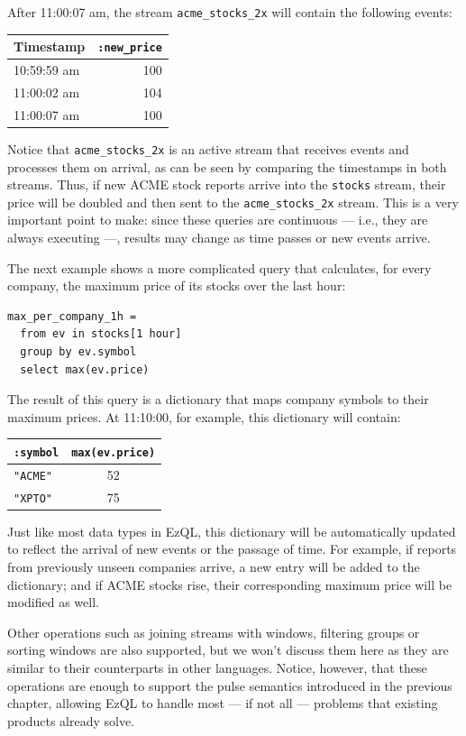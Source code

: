 \documentclass{report}
\begin{document}
After 11:00:07 am, the stream \verb=acme_stocks_2x= will contain the
following events:

\begin{tabular}{ |l|r| }
  \hline
  Timestamp & \verb=:new_price= \\
  \hline
  10:59:59 am & 100 \\
  11:00:02 am & 104 \\
  11:00:07 am & 100 \\
  \hline
\end{tabular}

Notice that \verb=acme_stocks_2x= is an active stream that receives
events and processes them on arrival, as can be seen by comparing the
timestamps in both streams. Thus, if new ACME stock reports arrive
into the \verb=stocks= stream, their price will be doubled and then
sent to the \verb=acme_stocks_2x= stream. This is a very important
point to make: since these queries are continuous --- i.e., they are
always executing ---, results may change as time passes or new events
arrive.

The next example shows a more complicated query that calculates, for
every company, the maximum price of its stocks over the last hour:

\begin{verbatim}
max_per_company_1h =
  from ev in stocks[1 hour]
  group by ev.symbol
  select max(ev.price)
\end{verbatim}

The result of this query is a dictionary that maps company symbols to
their maximum prices. At 11:10:00, for example, this dictionary will
contain:

\begin{tabular}{ |l|c| }
  \hline
  \verb=:symbol= & \verb=max(ev.price)= \\
  \hline
  \verb="ACME"= & 52 \\
  \verb="XPTO"= & 75 \\
  \hline
\end{tabular}

Just like most data types in EzQL, this dictionary will be
automatically updated to reflect the arrival of new events or the
passage of time. For example, if reports from previously unseen
companies arrive, a new entry will be added to the dictionary; and if
ACME stocks rise, their corresponding maximum price will be modified
as well.

Other operations such as joining streams with windows, filtering
groups or sorting windows are also supported, but we won't discuss
them here as they are similar to their counterparts in other
languages. Notice, however, that these operations are enough to
support the pulse semantics introduced in the previous chapter,
allowing EzQL to handle most --- if not all --- problems that existing
products already solve.
\end{document}
